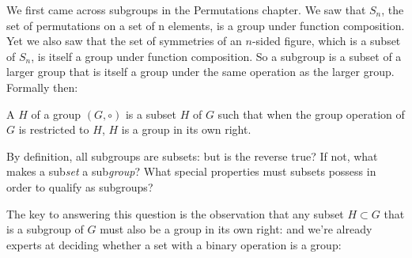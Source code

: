  We first came across subgroups in the Permutations chapter.  We saw that $S_n$, the set of permutations on a set of n elements, is a group under function composition.  Yet we also saw that the set of symmetries of an $n$-sided figure, which is a subset of $S_n$, is itself a group under function composition.  So a subgroup is a subset of a larger group that is itself a group under the same operation as the larger group.  Formally then: 

\begin{defn} \label{subgroup_defn}
A  $H$ of a group $(G,\circ)$ is a subset $H$ of $G$ such that when the group operation of $G$ is restricted to $H$, $H$ is a group in its own right. 
\end{defn}

By definition, all subgroups are subsets: but is the reverse true? If not, what makes a sub\emph{set} a sub\emph{group}? What special  properties must subsets possess in order to qualify as subgroups?

The key to answering this question is the observation that any subset $H \subset G$ that is a subgroup of $G$ must also be a group in its own right: and we're already experts at deciding whether a set with a binary operation is a group: 

